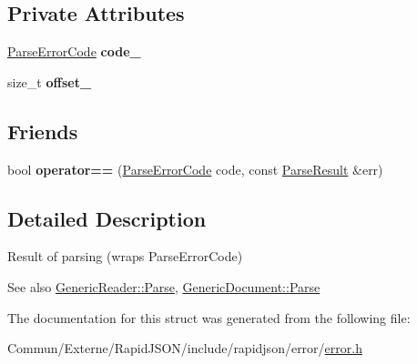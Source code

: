 \subsection*{Private Attributes}
\begin{DoxyCompactItemize}
\item 
\hyperlink{group___r_a_p_i_d_j_s_o_n___e_r_r_o_r_s_ga8d4b32dfc45840bca189ade2bbcb6ba7}{Parse\+Error\+Code} {\bfseries code\+\_\+}\hypertarget{struct_parse_result_aa30a53c4b7452efb82baf4767cda33fb}{}\label{struct_parse_result_aa30a53c4b7452efb82baf4767cda33fb}

\item 
size\+\_\+t {\bfseries offset\+\_\+}\hypertarget{struct_parse_result_a4854b4b3210fd1bbc0f1457aa0d2b65a}{}\label{struct_parse_result_a4854b4b3210fd1bbc0f1457aa0d2b65a}

\end{DoxyCompactItemize}
\subsection*{Friends}
\begin{DoxyCompactItemize}
\item 
bool {\bfseries operator==} (\hyperlink{group___r_a_p_i_d_j_s_o_n___e_r_r_o_r_s_ga8d4b32dfc45840bca189ade2bbcb6ba7}{Parse\+Error\+Code} code, const \hyperlink{struct_parse_result}{Parse\+Result} \&err)\hypertarget{struct_parse_result_a58c9982e833d1c74686506ac7449200c}{}\label{struct_parse_result_a58c9982e833d1c74686506ac7449200c}

\end{DoxyCompactItemize}


\subsection{Detailed Description}
Result of parsing (wraps Parse\+Error\+Code) 


 \begin{DoxySeeAlso}{See also}
\hyperlink{class_generic_reader_a0c450620d14ff1824e58bb7bd9b42099}{Generic\+Reader\+::\+Parse}, \hyperlink{class_generic_document_aebd4e7fddd80c1e1174837aee6d2159b}{Generic\+Document\+::\+Parse} 
\end{DoxySeeAlso}


The documentation for this struct was generated from the following file\+:\begin{DoxyCompactItemize}
\item 
Commun/\+Externe/\+Rapid\+J\+S\+O\+N/include/rapidjson/error/\hyperlink{error_8h}{error.\+h}\end{DoxyCompactItemize}
